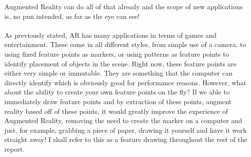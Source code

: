 \documentclass[11pt]{article}
\begin{document}
Augmented Reality can do all of that already and the scope of new
applications is, no pun intended, as far as the eye can see!    
\\ \\
As previously stated, AR has many applications in terms of games and 
entertainment. These come in all different styles, from simple use of a camera,
to using fixed feature points as markers, or using patterns as feature points
to identify placement of objects in the scene. Right now, these feature points
are either very simple or immutable. They are something that the computer
can directly identify which is obviously good for performance reasons. However,
what about the ability to create your own feature points on the fly? If we
able to immediately draw feature points and by extraction of these points, 
augment reality based off of these points, it would greatly improve the 
experience of Augmented Reality, removing the need to create the marker 
on a computer and just, for example, grabbing a piece of paper, drawing it
yourself and have it work straight away! I shall refer to this as a feature
drawing throughout the rest of the report. 
\end{document}
